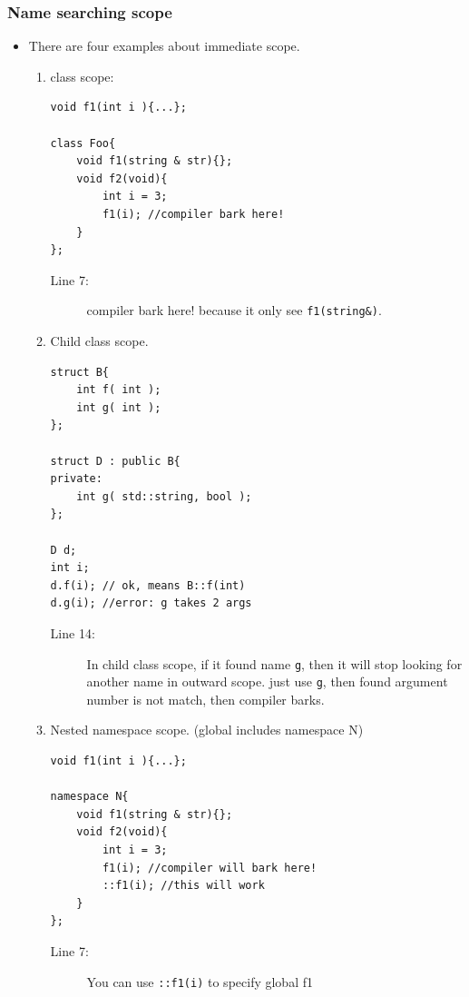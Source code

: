 \documentclass[a4paper,11pt,twoside]{book}
\begin{document}
\subsubsection{Name searching scope}
\begin{itemize}
	
	\item There are four examples about immediate scope.
	\begin{enumerate}
		\item class scope:
\begin{lstlisting}
void f1(int i ){...};

class Foo{
	void f1(string & str){};
	void f2(void){
		int i = 3;
		f1(i); //compiler bark here!
	}
};
\end{lstlisting}
\begin{description}
	\item[Line 7:] compiler bark here! because it only see \texttt{f1(string\&)}.
\end{description}
		
		\item Child class scope. 
\begin{lstlisting}
struct B{
	int f( int );
	int g( int );
};
		
struct D : public B{
private:
	int g( std::string, bool );
};
		
D d;
int i;
d.f(i); // ok, means B::f(int)
d.g(i); //error: g takes 2 args
\end{lstlisting}
\begin{description}
	\item[Line 14:] In child class scope, if it found name \texttt{g}, then it will stop looking for another name in outward scope. just use \texttt{g}, then found argument number is not match, then compiler barks.
\end{description}
		
\item Nested namespace scope. (global includes namespace N)
\begin{lstlisting}
void f1(int i ){...};

namespace N{
	void f1(string & str){};
	void f2(void){
		int i = 3;
		f1(i); //compiler will bark here!
		::f1(i); //this will work
	}
};
\end{lstlisting}
\begin{description}
	\item[Line 7:] You can use \texttt{::f1(i)} to specify global f1
\end{description}


\end{enumerate}
\end{itemize}
\end{document}

